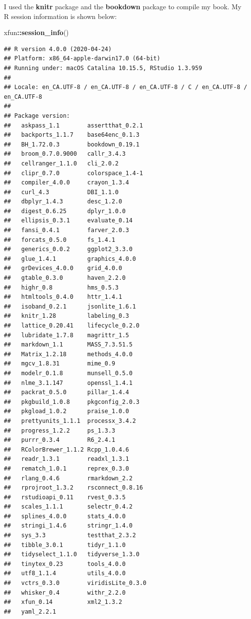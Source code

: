 \documentclass[
]{krantz}
\makeatletter
\newenvironment{Shaded}{\begin{snugshade}}{\end{snugshade}}
\newcommand{\KeywordTok}[1]{\textcolor[rgb]{0.27,0.27,0.27}{\textbf{#1}}}
\newcommand{\NormalTok}[1]{#1}
\newcommand{\OperatorTok}[1]{\textcolor[rgb]{0.43,0.43,0.43}{\textbf{#1}}}
\newenvironment{kframe}{%
\medskip{}
\setlength{\fboxsep}{.8em}
 \def\at@end@of@kframe{}%
 \ifinner\ifhmode%
  \def\at@end@of@kframe{\end{minipage}}%
  \begin{minipage}{\columnwidth}%
 \fi\fi%
 \def\FrameCommand##1{\hskip\@totalleftmargin \hskip-\fboxsep
 \colorbox{shadecolor}{##1}\hskip-\fboxsep
     \hskip-\linewidth \hskip-\@totalleftmargin \hskip\columnwidth}%
 \MakeFramed {\advance\hsize-\width
   \@totalleftmargin\z@ \linewidth\hsize
   \@setminipage}}%
 {\par\unskip\endMakeFramed%
 \at@end@of@kframe}
\renewenvironment{Shaded}{\begin{kframe}}{\end{kframe}}
\makeatother
\begin{document}
I used the \textbf{knitr} package \citep{xie2015} and the \textbf{bookdown} package \citep{R-bookdown} to compile my book. My R session information is shown below:

\begin{Shaded}
\begin{Highlighting}[]
\NormalTok{xfun}\OperatorTok{::}\KeywordTok{session_info}\NormalTok{()}
\end{Highlighting}
\end{Shaded}

\begin{verbatim}
## R version 4.0.0 (2020-04-24)
## Platform: x86_64-apple-darwin17.0 (64-bit)
## Running under: macOS Catalina 10.15.5, RStudio 1.3.959
## 
## Locale: en_CA.UTF-8 / en_CA.UTF-8 / en_CA.UTF-8 / C / en_CA.UTF-8 / en_CA.UTF-8
## 
## Package version:
##   askpass_1.1        assertthat_0.2.1  
##   backports_1.1.7    base64enc_0.1.3   
##   BH_1.72.0.3        bookdown_0.19.1   
##   broom_0.7.0.9000   callr_3.4.3       
##   cellranger_1.1.0   cli_2.0.2         
##   clipr_0.7.0        colorspace_1.4-1  
##   compiler_4.0.0     crayon_1.3.4      
##   curl_4.3           DBI_1.1.0         
##   dbplyr_1.4.3       desc_1.2.0        
##   digest_0.6.25      dplyr_1.0.0       
##   ellipsis_0.3.1     evaluate_0.14     
##   fansi_0.4.1        farver_2.0.3      
##   forcats_0.5.0      fs_1.4.1          
##   generics_0.0.2     ggplot2_3.3.0     
##   glue_1.4.1         graphics_4.0.0    
##   grDevices_4.0.0    grid_4.0.0        
##   gtable_0.3.0       haven_2.2.0       
##   highr_0.8          hms_0.5.3         
##   htmltools_0.4.0    httr_1.4.1        
##   isoband_0.2.1      jsonlite_1.6.1    
##   knitr_1.28         labeling_0.3      
##   lattice_0.20.41    lifecycle_0.2.0   
##   lubridate_1.7.8    magrittr_1.5      
##   markdown_1.1       MASS_7.3.51.5     
##   Matrix_1.2.18      methods_4.0.0     
##   mgcv_1.8.31        mime_0.9          
##   modelr_0.1.8       munsell_0.5.0     
##   nlme_3.1.147       openssl_1.4.1     
##   packrat_0.5.0      pillar_1.4.4      
##   pkgbuild_1.0.8     pkgconfig_2.0.3   
##   pkgload_1.0.2      praise_1.0.0      
##   prettyunits_1.1.1  processx_3.4.2    
##   progress_1.2.2     ps_1.3.3          
##   purrr_0.3.4        R6_2.4.1          
##   RColorBrewer_1.1.2 Rcpp_1.0.4.6      
##   readr_1.3.1        readxl_1.3.1      
##   rematch_1.0.1      reprex_0.3.0      
##   rlang_0.4.6        rmarkdown_2.2     
##   rprojroot_1.3.2    rsconnect_0.8.16  
##   rstudioapi_0.11    rvest_0.3.5       
##   scales_1.1.1       selectr_0.4.2     
##   splines_4.0.0      stats_4.0.0       
##   stringi_1.4.6      stringr_1.4.0     
##   sys_3.3            testthat_2.3.2    
##   tibble_3.0.1       tidyr_1.1.0       
##   tidyselect_1.1.0   tidyverse_1.3.0   
##   tinytex_0.23       tools_4.0.0       
##   utf8_1.1.4         utils_4.0.0       
##   vctrs_0.3.0        viridisLite_0.3.0 
##   whisker_0.4        withr_2.2.0       
##   xfun_0.14          xml2_1.3.2        
##   yaml_2.2.1
\end{verbatim}
\end{document}
